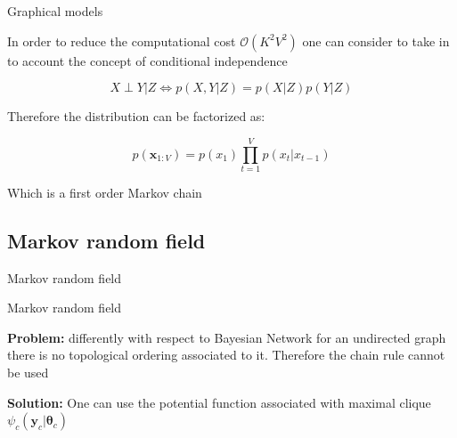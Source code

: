 \documentclass{beamer}
\begin{document}
\begin{frame}{Graphical models}

\begin{center}
In order to reduce the computational cost $\mathcal{O}(K^{2}V^{2})$ one can consider to take in to account the concept of conditional independence
\end{center}
\begin{equation}
X  \perp Y| Z \iff  p(X,Y|Z) = p(X|Z)p(Y|Z)
\end{equation}
\begin{center}
Therefore the distribution can be factorized as:
\end{center}
\begin{equation}
p(\textbf{x}_{1:V})=p(x_{1})\prod^{V}_{t=1}p(x_{t}|x_{t-1})
\end{equation}
\begin{center}
Which is a first order Markov chain
\end{center}
\end{frame}

\subsection{Markov random field}

\begin{frame}{}
\begin{center}
{\Huge Markov random field}
\end{center}
\end{frame}

\begin{frame}{Markov random field}
\begin{center}
\textbf{Problem:} differently with respect to Bayesian Network for an undirected graph there is no topological ordering associated to it. Therefore the chain rule cannot be used 
\end{center}
\begin{center}
\textbf{Solution:} One can use the potential function associated with maximal clique $\psi_{c}(\textbf{y}_{c}|\boldsymbol{\theta}_{c})$
\end{center}

\end{frame}
\end{document}
